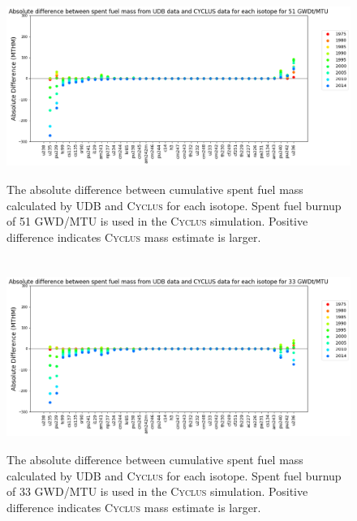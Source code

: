 \begin{frame}
    \frametitle{}
    \begin{figure}[htbp!]
        \begin{center}
          \includegraphics[height=6cm]{../figures/absolute_diff_all_51}
        \end{center}
              \caption{The absolute difference between cumulative spent fuel mass calculated by 
              UDB and \textsc{Cyclus} for each isotope. Spent fuel burnup of 51 GWD/MTU is used in the \textsc{Cyclus} simulation.
              Positive difference indicates \textsc{Cyclus}
              mass estimate is larger.}
        \label{fig:totalmass}
      \end{figure}
\end{frame}

\begin{frame}
    \frametitle{}
    \begin{figure}[htbp!]
        \begin{center}
          \includegraphics[height=6cm]{../figures/absolute_diff_all_33}
        \end{center}
        \caption{The absolute difference between cumulative spent fuel mass calculated by 
        UDB and \textsc{Cyclus} for each isotope. Spent fuel burnup of 33 GWD/MTU is used in the \textsc{Cyclus} simulation.
        Positive difference indicates \textsc{Cyclus}
        mass estimate is larger.}
        \label{fig:totalmass}
      \end{figure}
\end{frame}

